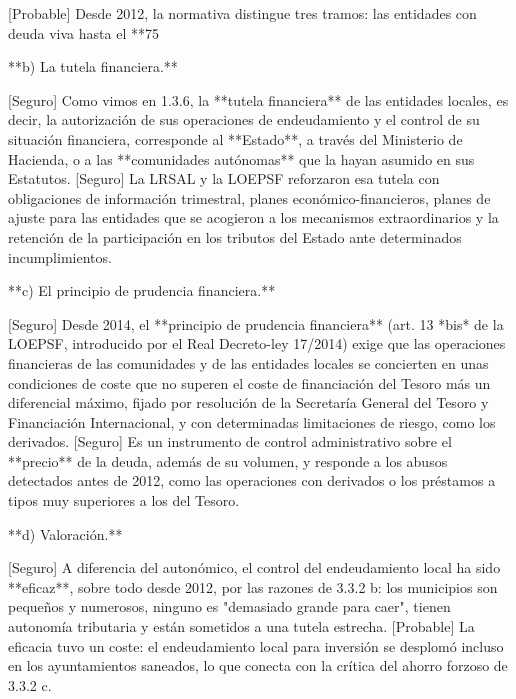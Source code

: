 \documentclass[10pt,a4paper]{article}
\begin{document}
[Probable] Desde 2012, la normativa distingue tres tramos: las entidades con deuda viva hasta el **75%

**b) La tutela financiera.**

[Seguro] Como vimos en 1.3.6, la **tutela financiera** de las entidades locales, es decir, la autorización de sus operaciones de endeudamiento y el control de su situación financiera, corresponde al **Estado**, a través del Ministerio de Hacienda, o a las **comunidades autónomas** que la hayan asumido en sus Estatutos. [Seguro] La LRSAL y la LOEPSF reforzaron esa tutela con obligaciones de información trimestral, planes económico-financieros, planes de ajuste para las entidades que se acogieron a los mecanismos extraordinarios y la retención de la participación en los tributos del Estado ante determinados incumplimientos.

**c) El principio de prudencia financiera.**

[Seguro] Desde 2014, el **principio de prudencia financiera** (art. 13 *bis* de la LOEPSF, introducido por el Real Decreto-ley 17/2014) exige que las operaciones financieras de las comunidades y de las entidades locales se concierten en unas condiciones de coste que no superen el coste de financiación del Tesoro más un diferencial máximo, fijado por resolución de la Secretaría General del Tesoro y Financiación Internacional, y con determinadas limitaciones de riesgo, como los derivados. [Seguro] Es un instrumento de control administrativo sobre el **precio** de la deuda, además de su volumen, y responde a los abusos detectados antes de 2012, como las operaciones con derivados o los préstamos a tipos muy superiores a los del Tesoro.

**d) Valoración.**

[Seguro] A diferencia del autonómico, el control del endeudamiento local ha sido **eficaz**, sobre todo desde 2012, por las razones de 3.3.2 b: los municipios son pequeños y numerosos, ninguno es "demasiado grande para caer", tienen autonomía tributaria y están sometidos a una tutela estrecha. [Probable] La eficacia tuvo un coste: el endeudamiento local para inversión se desplomó incluso en los ayuntamientos saneados, lo que conecta con la crítica del ahorro forzoso de 3.3.2 c.
\end{document}
